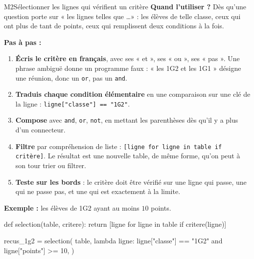 \begin{fichemethode}{M2}{Sélectionner les lignes qui vérifient un critère}
\textbf{Quand l'utiliser ?} Dès qu'une question porte sur « les lignes telles que \dots » :
les élèves de telle classe, ceux qui ont plus de tant de points, ceux qui remplissent deux
conditions à la fois.

\textbf{Pas à pas :}
\begin{enumerate}
  \item \textbf{Écris le critère en français}, avec ses « et », ses « ou », ses « pas ». Une
    phrase ambiguë donne un programme faux : « les 1G2 et les 1G1 » désigne une réunion,
    donc un \lstinline{or}, pas un \lstinline{and}.
  \item \textbf{Traduis chaque condition élémentaire} en une comparaison sur une clé de la
    ligne : \lstinline{ligne["classe"] == "1G2"}.
  \item \textbf{Compose} avec \lstinline{and}, \lstinline{or}, \lstinline{not}, en mettant
    les parenthèses dès qu'il y a plus d'un connecteur.
  \item \textbf{Filtre} par compréhension de liste :
    \lstinline{[ligne for ligne in table if critère]}. Le résultat est une nouvelle table, de même
    forme, qu'on peut à son tour trier ou filtrer.
  \item \textbf{Teste sur les bords} : le critère doit être vérifié sur une ligne qui passe,
    une qui ne passe pas, et une qui est exactement à la limite.
\end{enumerate}

\textbf{Exemple :} les élèves de 1G2 ayant au moins $10$ points.

\begin{python}
def selection(table, critere):
    return [ligne for ligne in table if critere(ligne)]

recus_1g2 = selection(
    table,
    lambda ligne: ligne["classe"] == "1G2" and ligne["points"] >= 10,
)
\end{python}


\end{fichemethode}
